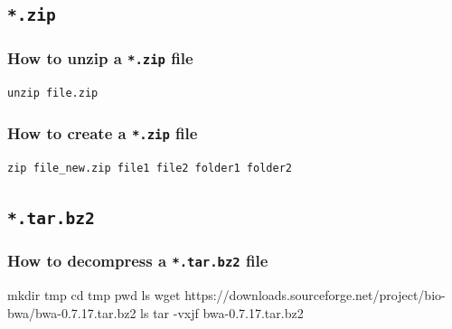 \documentclass[]{book}
\makeatletter
\newenvironment{Shaded}{\begin{snugshade}}{\end{snugshade}}
\newcommand{\BuiltInTok}[1]{#1}
\newcommand{\FunctionTok}[1]{\textcolor[rgb]{0.00,0.00,0.00}{#1}}
\newcommand{\NormalTok}[1]{#1}
\newenvironment{kframe}{%
\medskip{}
\setlength{\fboxsep}{.8em}
 \def\at@end@of@kframe{}%
 \ifinner\ifhmode%
  \def\at@end@of@kframe{\end{minipage}}%
  \begin{minipage}{\columnwidth}%
 \fi\fi%
 \def\FrameCommand##1{\hskip\@totalleftmargin \hskip-\fboxsep
 \colorbox{shadecolor}{##1}\hskip-\fboxsep
     \hskip-\linewidth \hskip-\@totalleftmargin \hskip\columnwidth}%
 \MakeFramed {\advance\hsize-\width
   \@totalleftmargin\z@ \linewidth\hsize
   \@setminipage}}%
 {\par\unskip\endMakeFramed%
 \at@end@of@kframe}
\renewenvironment{Shaded}{\begin{kframe}}{\end{kframe}}
\makeatother
\begin{document}
\hypertarget{zip}{%
\subsection{\texorpdfstring{\texttt{*.zip}}{*.zip}}\label{zip}}

\hypertarget{how-to-unzip-a-.zip-file}{%
\subsubsection{\texorpdfstring{How to unzip a \texttt{*.zip} file}{How to unzip a *.zip file}}\label{how-to-unzip-a-.zip-file}}

\begin{verbatim}
unzip file.zip
\end{verbatim}

\hypertarget{how-to-create-a-.zip-file}{%
\subsubsection{\texorpdfstring{How to create a \texttt{*.zip} file}{How to create a *.zip file}}\label{how-to-create-a-.zip-file}}

\begin{verbatim}
zip file_new.zip file1 file2 folder1 folder2
\end{verbatim}

\hypertarget{tar.bz2}{%
\subsection{\texorpdfstring{\texttt{*.tar.bz2}}{*.tar.bz2}}\label{tar.bz2}}

\hypertarget{how-to-decompress-a-.tar.bz2-file}{%
\subsubsection{\texorpdfstring{How to decompress a \texttt{*.tar.bz2} file}{How to decompress a *.tar.bz2 file}}\label{how-to-decompress-a-.tar.bz2-file}}

\begin{Shaded}
\begin{Highlighting}[]
\FunctionTok{mkdir}\NormalTok{ tmp}
\BuiltInTok{cd}\NormalTok{ tmp}
\BuiltInTok{pwd}
\FunctionTok{ls} 
\FunctionTok{wget}\NormalTok{ https://downloads.sourceforge.net/project/bio-bwa/bwa-0.7.17.tar.bz2}
\FunctionTok{ls}
\FunctionTok{tar}\NormalTok{ -vxjf bwa-0.7.17.tar.bz2}
\end{Highlighting}
\end{Shaded}
\end{document}
